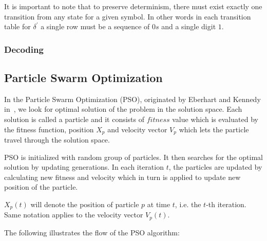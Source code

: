 \documentclass[runningheads,a4paper]{llncs}
\begin{document}
It is important to note that to preserve determinism, there must exist exactly one transition from any state for a given symbol. In other words in each transition table for $\delta^{'}$ a single row must be a sequence of $0s$ and a single digit $1$.

\subsubsection{Decoding}



\subsection{Particle Swarm Optimization}
In the Particle Swarm Optimization (PSO), originated by Eberhart and Kennedy in~\cite{pso_origin}, we look for optimal solution of the problem in the solution space. Each solution is called a particle and it consists of $fitness$ value which is evaluated by the fitness function, position $X_p$ and velocity vector $V_p$ which lets the particle travel through the solution space.

PSO is initialized with random group of particles. It then searches for the optimal solution by updating generations.
In each iteration $t$, the particles are updated by calculating new fitness and velocity which in turn is applied to update new position of the particle.

$X_p(t)$ will denote the position of particle $p$ at time $t$, i.e. the $t$-th iteration. Same notation applies to the velocity vector $V_p(t)$.

The following illustrates the flow of the PSO algorithm:
\end{document}
